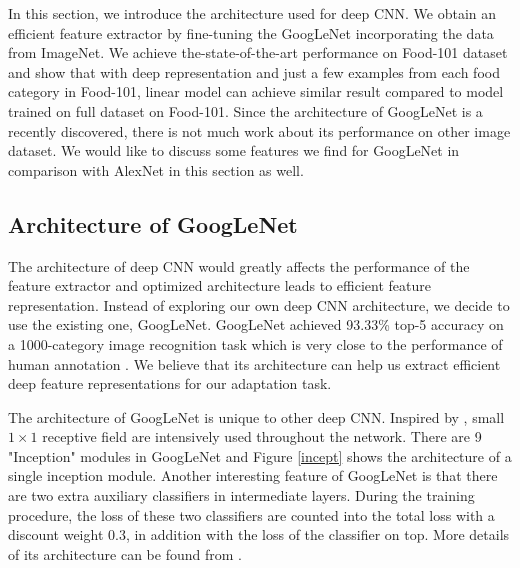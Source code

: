 ﻿In this section, we introduce the architecture used for deep CNN. We obtain an efficient feature extractor by fine-tuning the GoogLeNet incorporating the data from ImageNet. We achieve the-state-of-the-art performance on Food-101 dataset and show that with deep representation and just a few examples from each food category in Food-101, linear model can achieve similar result compared to model trained on full dataset on Food-101. Since the architecture of GoogLeNet is a recently discovered, there is not much work about its performance on other image dataset. We would like to discuss some features we find for GoogLeNet in comparison with AlexNet \cite{krizhevsky2012imagenet} in this section as well.
\subsection{Architecture of GoogLeNet}
The architecture of deep CNN would greatly affects the performance of the feature extractor and optimized architecture leads to efficient feature representation.
Instead of exploring our own deep CNN architecture, we decide to use the existing one, GoogLeNet. GoogLeNet achieved 93.33\% top-5 accuracy on a 1000-category image recognition task which is very close to the performance of human annotation \cite{szegedy2014going}. We believe that its architecture can help us extract efficient deep feature representations for our adaptation task.

 The architecture of GoogLeNet is unique to other deep CNN. Inspired by \cite{linNiN}, small $1\times 1$ receptive field are intensively used throughout the network. There are 9 "Inception" modules in GoogLeNet and Figure \ref{incept} shows the architecture of a single inception module. Another interesting feature of GoogLeNet is that there are two extra auxiliary classifiers in intermediate layers. During the training procedure, the loss of these two classifiers are counted into the total loss with a discount weight 0.3, in addition with the loss of the classifier on top. More details of its architecture can be found from \cite{szegedy2014going}.

